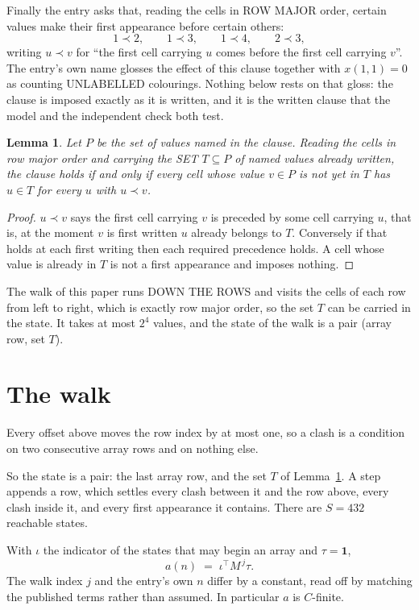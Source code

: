 \documentclass[11pt,a4paper]{article}
\theoremstyle{plain}
\newtheorem{lemma}[theorem]{Lemma}
\theoremstyle{definition}
\begin{document}
Finally the entry asks that, reading the cells in ROW MAJOR order, certain values make their
first appearance before certain others:
\[
1\prec 2,\qquad 1\prec 3,\qquad 1\prec 4,\qquad 2\prec 3 ,
\]
writing $u\prec v$ for ``the first cell carrying $u$ comes before the first cell carrying
$v$''. The entry's own name glosses the effect of this clause together with $x(1,1)=0$ as
counting UNLABELLED colourings. Nothing below rests on that gloss: the clause is imposed
exactly as it is written, and it is the written clause that the model and the independent
check both test.

\begin{lemma}\label{lem:seen}
Let $P$ be the set of values named in the clause. Reading the cells in row major order and
carrying the SET $T\subseteq P$ of named values already written, the clause holds if and only
if every cell whose value $v\in P$ is not yet in $T$ has $u\in T$ for every $u$ with $u\prec v$.
\end{lemma}

\begin{proof}
$u\prec v$ says the first cell carrying $v$ is preceded by some cell carrying $u$, that is, at
the moment $v$ is first written $u$ already belongs to $T$. Conversely if that holds at each
first writing then each required precedence holds. A cell whose value is already in $T$ is not
a first appearance and imposes nothing.
\end{proof}

The walk of this paper runs DOWN THE ROWS and visits the cells of each row from left to right,
which is exactly row major order, so the set $T$ can be carried in the state. It takes at most
$2^{4}$ values, and the state of the walk is a pair (array row, set $T$).

\section{The walk}

Every offset above moves the row index by at most one, so a clash is a condition on two
consecutive array rows and on nothing else.

So the state is a pair: the last array row, and the set $T$ of Lemma~\ref{lem:seen}. A step
appends a row, which settles every clash between it and the row above, every clash inside it,
and every first appearance it contains. There are $S=432$ reachable states.

With $\iota$ the indicator of the states that may begin an array and $\tau=\mathbf{1}$,
\[
a(n)\;=\;\iota^{\!\top}M^{\,j}\tau .
\]
The walk index $j$ and the entry's own $n$ differ by a constant, read off by matching the
published terms rather than assumed. In particular $a$ is $C$-finite.
\end{document}
